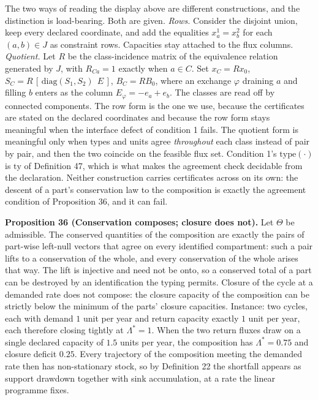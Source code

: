 \documentclass[11pt]{article}
\begin{document}
The two ways of reading the display above are different constructions, and the distinction is load-bearing. Both are given. \emph{Rows.} Consider the disjoint union, keep every declared coordinate, and add the equalities \(x_a^1 = x_b^2\) for each \((a,b) \in J\) as constraint rows. Capacities stay attached to the flux columns. \emph{Quotient.} Let \(R\) be the class-incidence matrix of the equivalence relation generated by \(J\), with \(R_{Ca} = 1\) exactly when \(a \in C\). Set \(x_C = R x_0\), \(S_C = R\,[\,\mathrm{diag}(S_1, S_2)\ \ E\,]\), \(B_C = R B_0\), where an exchange \(\varphi\) draining \(a\) and filling \(b\) enters as the column \(E_\varphi = -e_a + e_b\). The classes are read off by connected components. The row form is the one we use, because the certificates are stated on the declared coordinates and because the row form stays meaningful when the interface defect of condition 1 fails. The quotient form is meaningful only when types and units agree \emph{throughout} each class instead of pair by pair, and then the two coincide on the feasible flux set. Condition 1's \(\mathrm{type}(\cdot)\) is \(\mathrm{ty}\) of Definition 47, which is what makes the agreement check decidable from the declaration. Neither construction carries certificates across on its own: the descent of a part's conservation law to the composition is exactly the agreement condition of Proposition 36, and it can fail.

\textbf{Proposition 36 (Conservation composes; closure does not).} Let \(\Theta\) be admissible. The conserved quantities of the composition are exactly the pairs of part-wise left-null vectors that agree on every identified compartment: such a pair lifts to a conservation of the whole, and every conservation of the whole arises that way. The lift is injective and need not be onto, so a conserved total of a part can be destroyed by an identification the typing permits. Closure of the cycle at a demanded rate does not compose: the closure capacity of the composition can be strictly below the minimum of the parts' closure capacities. Instance: two cycles, each with demand \(1\) unit per year and return capacity exactly \(1\) unit per year, each therefore closing tightly at \(\Lambda^{*} = 1\). When the two return fluxes draw on a single declared capacity of \(1.5\) units per year, the composition has \(\Lambda^{*} = 0.75\) and closure deficit \(0.25\). Every trajectory of the composition meeting the demanded rate then has non-stationary stock, so by Definition 22 the shortfall appears as support drawdown together with sink accumulation, at a rate the linear programme fixes.
\end{document}
